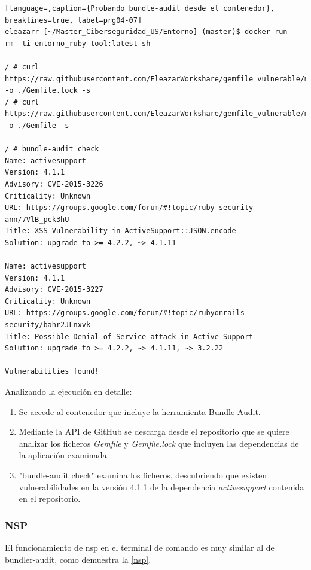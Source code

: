 \begin{lstlisting}[language=,caption={Probando bundle-audit desde el contenedor}, breaklines=true, label=prg04-07]
eleazarr [~/Master_Ciberseguridad_US/Entorno] (master)$ docker run --rm -ti entorno_ruby-tool:latest sh

/ # curl https://raw.githubusercontent.com/EleazarWorkshare/gemfile_vulnerable/master/Gemfile.lock -o ./Gemfile.lock -s
/ # curl https://raw.githubusercontent.com/EleazarWorkshare/gemfile_vulnerable/master/Gemfile -o ./Gemfile -s

/ # bundle-audit check
Name: activesupport
Version: 4.1.1
Advisory: CVE-2015-3226
Criticality: Unknown
URL: https://groups.google.com/forum/#!topic/ruby-security-ann/7VlB_pck3hU
Title: XSS Vulnerability in ActiveSupport::JSON.encode
Solution: upgrade to >= 4.2.2, ~> 4.1.11

Name: activesupport
Version: 4.1.1
Advisory: CVE-2015-3227
Criticality: Unknown
URL: https://groups.google.com/forum/#!topic/rubyonrails-security/bahr2JLnxvk
Title: Possible Denial of Service attack in Active Support
Solution: upgrade to >= 4.2.2, ~> 4.1.11, ~> 3.2.22

Vulnerabilities found!

\end{lstlisting}

Analizando la ejecución en detalle:

\begin{enumerate}
	\item Se accede al contenedor que incluye la herramienta Bundle Audit.
	\item Mediante la \gls{API} de GitHub se descarga desde el repositorio que se quiere analizar los ficheros \textit{Gemfile} y \textit{Gemfile.lock} que incluyen las dependencias de la aplicación examinada.
	\item "bundle-audit check" examina los ficheros, descubriendo que existen vulnerabilidades en la versión 4.1.1 de la dependencia \textit{activesupport} contenida en el repositorio.
\end{enumerate}

\subsubsection{NSP}

El funcionamiento de nsp en el terminal de comando es muy similar al de bundler-audit, como demuestra la \autoref{nsp}.



